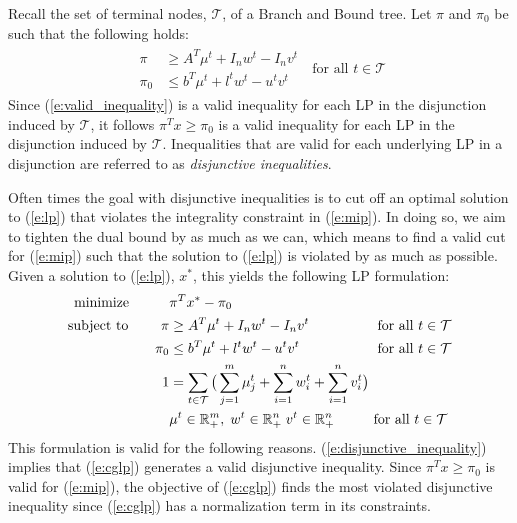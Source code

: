 \documentclass[10pt]{article}
\begin{document}
	Recall the set of terminal nodes, $ \mathcal{T} $, of a Branch and Bound tree. Let $ \pi $ and $ \pi_0 $ be such that the following holds:
	\begin{align}
		\begin{split}
			\pi &\geq A^T \mu^t + I_n w^t - I_n v^t \\
			\pi_0 & \leq b^T \mu^t + l^t w^t - u^t v^t
		\end{split} \; \text{ for all } t \in \mathcal{T} \label{e:disjunctive_inequality}
	\end{align}
	Since (\ref{e:valid_inequality}) is a valid inequality for each LP in the disjunction induced by $ \mathcal{T} $, it follows $ \pi^T x \geq \pi_0 $ is a valid inequality for each LP in the disjunction induced by $ \mathcal{T} $. Inequalities that are valid for each underlying LP in a disjunction are referred to as \textit{disjunctive inequalities}.
	
	Often times the goal with disjunctive inequalities is to cut off an optimal solution to (\ref{e:lp}) that violates the integrality constraint in (\ref{e:mip}). In doing so, we aim to tighten the dual bound by as much as we can, which means to find a valid cut for (\ref{e:mip}) such that the solution to (\ref{e:lp}) is violated by as much as possible. Given a solution to (\ref{e:lp}), $ x^* $, this yields the following LP formulation:
	\begin{equation}
		\begin{alignedat}{2} \label{e:cglp}
			\text{minimize } \; \; \qquad & \pi^T x^* - \pi_0 && \\
			\text{subject to } \qquad \pi & \geq A^T \mu^t + I_n w^t - I_n v^t && \; \text{ for all } t \in \mathcal{T} \\
			\pi_0 & \leq b^T \mu^t + l^t w^t - u^t v^t && \; \text{ for all } t \in \mathcal{T} \\
			1 & = \sum_{t \in \mathcal{T}} \big( \sum_{j=1}^{m} \mu_j^t + \sum_{i=1}^{n} w_i^t + \sum_{i=1}^{n} v_i^t \big) && \\
			& \mu^t \in \mathbb{R}_+^m, \; w^t \in \mathbb{R}_+^n \; v^t \in \mathbb{R}_+^n && \text{ for all } t \in \mathcal{T}
		\end{alignedat}
	\end{equation}
	This formulation is valid for the following reasons. (\ref{e:disjunctive_inequality}) implies that (\ref{e:cglp}) generates a valid disjunctive inequality. Since $ \pi^T x \geq \pi_0 $ is valid for (\ref{e:mip}), the objective of (\ref{e:cglp}) finds the most violated disjunctive inequality since (\ref{e:cglp}) has a normalization term in its constraints.
	
\end{document}
